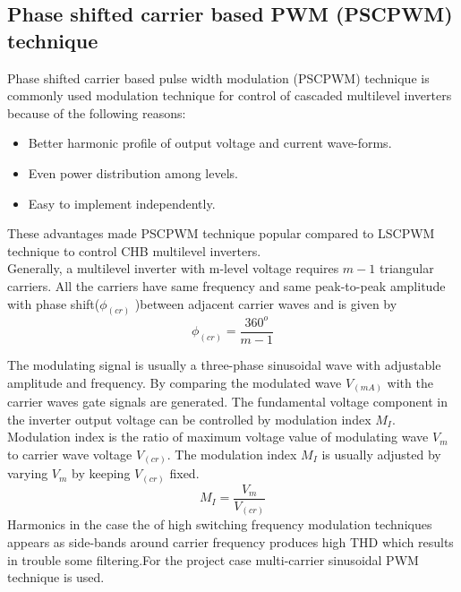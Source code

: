 \subsection{Phase shifted carrier based PWM (PSCPWM) technique}
 Phase shifted carrier based pulse width modulation
(PSCPWM) technique is commonly used modulation technique for
control of cascaded multilevel inverters because of the following
reasons:
\begin{itemize}
\item Better harmonic profile of output voltage and current
wave-forms.
\item Even power distribution among levels.
\item Easy to implement independently. 
\end{itemize}
These advantages made PSCPWM technique popular compared to LSCPWM technique to control CHB multilevel inverters.\\
Generally, a multilevel inverter with m-level voltage requires $m-1$ triangular carriers. All the carriers have same frequency and same peak-to-peak amplitude with phase shift($\phi_(cr)$ )between adjacent carrier waves  and is given by
$$\phi_(cr)=\frac{360^o}{m-1} $$

The modulating signal is usually a three-phase sinusoidal wave
with adjustable amplitude and frequency. By comparing the
modulated wave $V_(mA)$ with the carrier waves gate signals are
generated.
 The fundamental voltage component in the inverter output
voltage can be controlled by modulation index $M_I$. Modulation index
is the ratio of maximum voltage value of modulating wave $V_m$ to
carrier wave voltage $V_(cr)$.
The modulation index $M_I$ is usually adjusted by varying $V_m$ by
keeping $V_(cr)$ fixed.
$$M_I=\frac{V_m}{V_(cr)}$$
Harmonics in the case the of high switching
frequency modulation techniques appears as side-bands around
carrier frequency produces high THD which results in trouble some
filtering.For the project case multi-carrier sinusoidal PWM technique is used.
